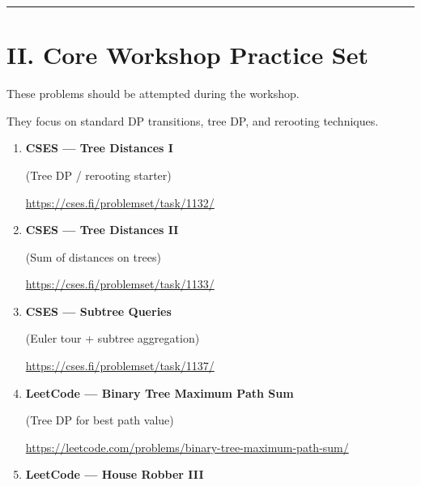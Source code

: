 \documentclass[11pt]{article}
\begin{document}
\vspace{1em}
\hrule
\vspace{1em}

\section*{II. Core Workshop Practice Set}

These problems should be attempted during the workshop.

They focus on standard DP transitions, tree DP, and rerooting techniques.

\begin{enumerate}

\item \textbf{CSES --- Tree Distances I}

(Tree DP / rerooting starter)

\vspace{0.3em}
{\url{https://cses.fi/problemset/task/1132/}}

\vspace{0.8em}

\item \textbf{CSES --- Tree Distances II}

(Sum of distances on trees)

\vspace{0.3em}
{\url{https://cses.fi/problemset/task/1133/}}

\vspace{0.8em}

\item \textbf{CSES --- Subtree Queries}

(Euler tour + subtree aggregation)

\vspace{0.3em}
{\url{https://cses.fi/problemset/task/1137/}}

\vspace{0.8em}

\item \textbf{LeetCode --- Binary Tree Maximum Path Sum}

(Tree DP for best path value)

\vspace{0.3em}
{\url{https://leetcode.com/problems/binary-tree-maximum-path-sum/}}

\vspace{0.8em}

\item \textbf{LeetCode --- House Robber III}


\end{enumerate}
\end{document}
